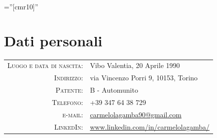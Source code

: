\documentclass[a4paper,10pt]{article} %
\begin{document}
\pagestyle{empty} %

\font\fb=''[cmr10]'' %


\noindent
\par{\par}
\small

\par{\bigskip\par} %

\section{Dati personali}

\begin{tabular}{rl}
\textsc{Luogo e data di nascita:} & Vibo Valentia, 20 Aprile 1990 \\
\textsc{Indirizzo:} & via Vincenzo Porri 9, 10153, Torino \\
\textsc{Patente:} & B - Automunito \\
\textsc{Telefono:} & +39 347 64 38 729 \\
\textsc{e-mail:} & \href{mailto:carmelolagamba90@gmail.com}{carmelolagamba90@gmail.com}\\
\textsc{LinkedIn:} & \href{https://www.linkedin.com/in/carmelolagamba/}{www.linkedin.com/in/carmelolagamba/}
\end{tabular}
\end{document}
